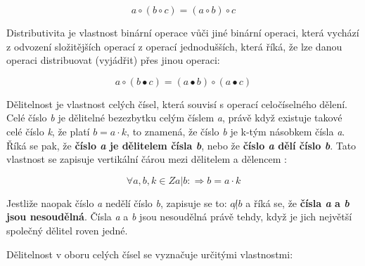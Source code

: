 $$ a \circ (b \circ c) = (a \circ b) \circ c $$


Distributivita je vlastnost binární operace vůči jiné binární operaci, která vychází z odvození složitějších operací z operací jednodušších, která říká, že lze danou operaci distribuovat (vyjádřit) přes jinou operaci:

$$ a \circ (b \bullet c) = (a \bullet b) \circ (a \bullet c) $$





Dělitelnost je vlastnost celých čísel, která souvisí s operací celočíselného dělení. Celé číslo {\it b} je dělitelné bezezbytku celým číslem {\it a}, právě když existuje takové celé číslo {\it k}, že platí $b = a\cdot k$, to znamená, že číslo {\it b} je k-tým násobkem čísla {\it a}. Říká se pak, že {\bf číslo {\it a} je dělitelem čísla {\it b}}, nebo že {\bf číslo {\it a} dělí číslo {\it b}}. Tato vlastnost se zapisuje vertikální čárou mezi dělitelem a dělencem :

$$ \forall a,b,k \in Z a | b: \Rightarrow b = a\cdot k $$

Jestliže naopak číslo {\it a} nedělí číslo {\it b}, zapisuje se to: $a\not | b$ a říká se, že {\bf čísla {\it a} a {\it b} jsou nesoudělná}. Čísla {\it a} a {\it b} jsou nesoudělná právě tehdy, když je jich největší společný dělitel roven jedné.


Dělitelnost v oboru celých čísel se vyznačuje určitými vlastnostmi:

\vskip 4mm

